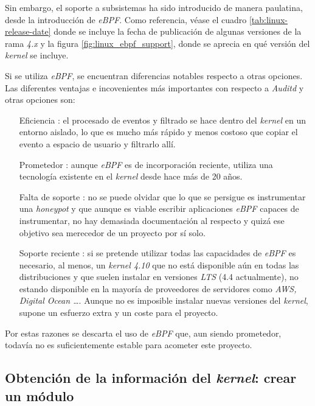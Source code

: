 Sin embargo, el soporte a subsistemas ha sido introducido de manera paulatina, desde la introducción de \emph{eBPF}. Como referencia, véase el cuadro \ref{tab:linux-release-date} donde se incluye la fecha de publicación de algunas versiones de la rama
\emph{4.x} y la figura \ref{fig:linux_ebpf_support}, donde se aprecia en qué versión del \emph{kernel} se incluye.

\clearpage


Si se utiliza \emph{eBPF}, se encuentran diferencias notables respecto a otras opciones. Las diferentes ventajas e incovenientes más importantes con respecto a \emph{Auditd} y otras opciones son:
\begin{enumerate}
    \item[Eficiencia]: el procesado de eventos y filtrado se hace dentro del \emph{kernel} en un entorno aislado, lo que es mucho más
    rápido y menos costoso que copiar el evento a espacio de usuario y filtrarlo allí.
    \item[Prometedor]: aunque \emph{eBPF} es de incorporación reciente, utiliza una tecnología existente en el \emph{kernel} desde hace más de 20 años.
    \item[Falta de soporte]: no se puede olvidar que lo que se persigue es instrumentar una \emph{honeypot} y que aunque es viable escribir aplicaciones \emph{eBPF} capaces de instrumentar, no hay demasiada documentación al respecto
    y quizá ese objetivo sea merecedor de un proyecto por sí solo.
    \item[Soporte reciente]: si se pretende utilizar todas las capacidades de \emph{eBPF} es necesario, al menos, un \emph{kernel 4.10} que no está disponible aún en todas las distribuciones y que suelen instalar en
    versiones \emph{LTS} (4.4 actualmente), no estando disponible en la mayoría de proveedores de servidores como \emph{AWS, Digital Ocean \ldots}. Aunque no es imposible instalar nuevas versiones del \emph{kernel},
    supone un esfuerzo extra y un coste para el proyecto.
\end{enumerate}

Por estas razones se descarta el uso de \emph{eBPF} que, aun siendo prometedor, todavía no es suficientemente estable para acometer este proyecto.
\clearpage

\subsection{Obtención de la información del \emph{kernel}: crear un módulo}
\label{subsec:kernel-modulo}

